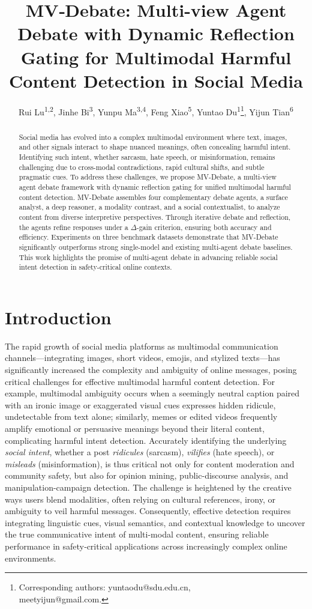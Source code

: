 \documentclass[letterpaper]{article} %
\title{MV‑Debate: Multi-view Agent Debate with Dynamic Reflection Gating for Multimodal Harmful Content Detection in Social Media }
\author{
  Rui Lu\textsuperscript{\rm 1,2},
  Jinhe Bi\textsuperscript{\rm 3},
  Yunpu Ma\textsuperscript{\rm 3,4},
  Feng Xiao\textsuperscript{\rm 5},
  Yuntao Du\textsuperscript{\rm 1}\thanks{{\raggedright Corresponding authors: yuntaodu@sdu.edu.cn,\\ meetyijun@gmail.com.}},
  Yijun Tian\textsuperscript{\rm 6}\footnotemark[\value{footnote}]
}
\begin{document}
\maketitle

\begin{abstract}

Social media has evolved into a complex multimodal environment where text, images, and other signals interact to shape nuanced meanings, often concealing harmful intent. Identifying such intent, whether sarcasm, hate speech, or misinformation, remains challenging due to cross-modal contradictions, rapid cultural shifts, and subtle pragmatic cues. To address these challenges, we propose MV-Debate, a multi-view agent debate framework with dynamic reflection gating for unified multimodal harmful content detection. MV-Debate assembles four complementary debate agents, a surface analyst, a deep reasoner, a modality contrast, and a social contextualist, to analyze content from diverse interpretive perspectives. Through iterative debate and reflection, the agents refine responses under a $\Delta$-gain criterion, ensuring both accuracy and efficiency. Experiments on three benchmark datasets demonstrate that MV-Debate significantly outperforms strong single-model and existing multi-agent debate baselines. This work highlights the promise of multi-agent debate in advancing reliable social intent detection in safety-critical online contexts.

\end{abstract}
\vspace{-3mm}
\section{Introduction}




The rapid growth of social media platforms as multimodal communication channels—integrating images, short videos, emojis, and stylized texts—has significantly increased the complexity and ambiguity of online messages, posing critical challenges for effective multimodal harmful content detection. For example, multimodal ambiguity occurs when a seemingly neutral caption paired with an ironic image or exaggerated visual cues expresses hidden ridicule, undetectable from text alone; similarly, memes or edited videos frequently amplify emotional or persuasive meanings beyond their literal content, complicating harmful intent detection.  Accurately identifying the underlying \emph{social intent}, whether a post \emph{ridicules} (sarcasm), \emph{vilifies} (hate speech), or \emph{misleads} (misinformation), is thus critical not only for content moderation and community safety, but also for opinion mining, public-discourse analysis, and manipulation-campaign detection. The challenge is heightened by the creative ways users blend modalities, often relying on cultural references, irony, or ambiguity to veil harmful messages. Consequently, effective detection requires integrating linguistic cues, visual semantics, and contextual knowledge to uncover the true communicative intent of multi-modal content, ensuring reliable performance in safety‑critical applications across increasingly complex online environments.
\end{document}
